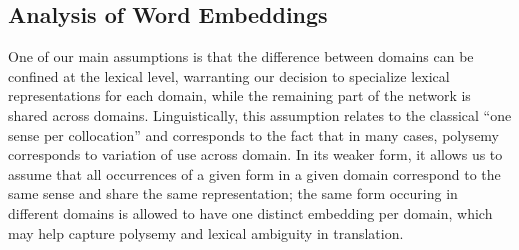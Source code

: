 \documentclass[11pt,a4paper]{article}
\begin{document}
\begin{table}[!h]
\begin{center}
\end{center}
\caption{BPE-detokenized BLEU scores for the Transformer architecture for varying domain-specific embedding sizes \label{tab:embedding-size}}
\end{table}

\subsection{Analysis of Word Embeddings \label{ssec:word_embeddings}}
One of our main assumptions is that the difference between domains can be confined at the lexical level, warranting our decision to specialize lexical representations for each domain, while the remaining part of the network is shared across domains. Linguistically, this assumption relates to the classical ``one sense per collocation'' \cite{Yarowsky93onesense} and corresponds to the fact that in many cases, polysemy corresponds to variation of use across domain. In its weaker form, it allows us to assume that all occurrences of a given form in a given domain correspond to the same sense and share the same representation; the same form occuring in different domains is allowed to have one distinct embedding per domain, which may help capture polysemy and lexical ambiguity in translation. 
\end{document}
